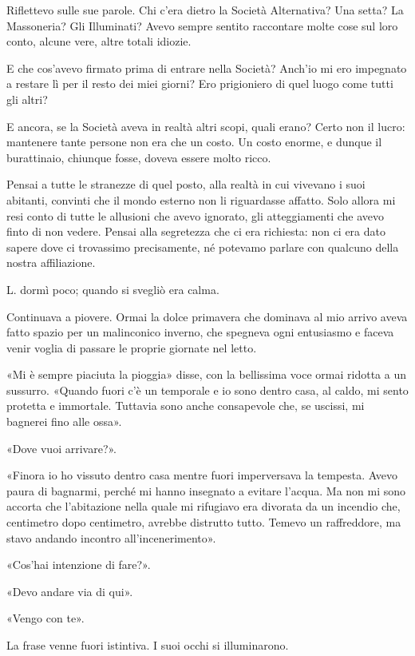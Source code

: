 Riflettevo sulle sue parole. Chi c'era dietro la Società Alternativa? Una setta? La Massoneria? Gli
Illuminati? Avevo sempre sentito raccontare molte cose sul loro conto, alcune vere, altre totali
idiozie.

E che cos'avevo firmato prima di entrare nella Società? Anch'io mi ero impegnato a restare lì per il
resto dei miei giorni? Ero prigioniero di quel luogo come tutti gli altri?

E ancora, se la Società aveva in realtà altri scopi, quali erano? Certo non il lucro: mantenere
tante persone non era che un costo. Un costo enorme, e dunque il burattinaio, chiunque fosse, doveva
essere molto ricco.

Pensai a tutte le stranezze di quel posto, alla realtà in cui vivevano i suoi abitanti, convinti che
il mondo esterno non li riguardasse affatto. Solo allora mi resi conto di tutte le allusioni che
avevo ignorato, gli atteggiamenti che avevo finto di non vedere. Pensai alla segretezza che ci era
richiesta: non ci era dato sapere dove ci trovassimo precisamente, né potevamo parlare con qualcuno
della nostra affiliazione.

L. dormì poco; quando si svegliò era calma.

Continuava a piovere. Ormai la dolce primavera che dominava al mio arrivo aveva fatto spazio per un
malinconico inverno, che spegneva ogni entusiasmo e faceva venir voglia di passare le proprie
giornate nel letto.

«Mi è sempre piaciuta la pioggia» disse, con la bellissima voce ormai ridotta a un sussurro. «Quando
fuori c'è un temporale e io sono dentro casa, al caldo, mi sento protetta e immortale. Tuttavia sono
anche consapevole che, se uscissi, mi bagnerei fino alle ossa».

«Dove vuoi arrivare?».

«Finora io ho vissuto dentro casa mentre fuori imperversava la tempesta. Avevo paura di bagnarmi,
perché mi hanno insegnato a evitare l'acqua. Ma non mi sono accorta che l'abitazione nella quale mi
rifugiavo era divorata da un incendio che, centimetro dopo centimetro, avrebbe distrutto tutto.
Temevo un raffreddore, ma stavo andando incontro all'incenerimento».

«Cos'hai intenzione di fare?».

«Devo andare via di qui».

«Vengo con te».

La frase venne fuori istintiva. I suoi occhi si illuminarono.

